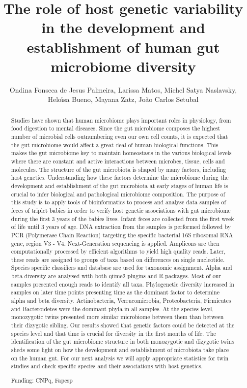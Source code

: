 \documentclass[twoside]{article}
\title{\vspace{-15mm}\fontsize{24pt}{10pt}\selectfont\textbf{ The role of host genetic variability in the development and establishment of human gut microbiome diversity }} %
\author{ Ondina Fonseca de Jesus Palmeira, Larissa Matos, Michel Satya Naslavsky, Helo\'{\i}sa Bueno, Mayana Zatz, Jo\~ao Carlos Setubal }
\affil{ Institute of Mathematics and Statistics - University of S\~ao Paulo }
\date{}
\begin{document}
  
  
  \maketitle %
  
  
  \thispagestyle{fancy} %
  
  
  \begin{abstract}
  Studies have shown that human microbiome plays important roles in physiology,  from food digestion to mental diseases. Since the gut microbiome composes the highest number of microbial cells outnumbering even our own cell counts,  it is expected that the gut microbiome would affect a great deal of human biological functions. This makes the gut microbiome key to maintain homeostasis in the various biological levels where there are constant and active interactions between microbes,  tissue,  cells and molecules. The structure of the gut microbiota is shaped by many factors,  including host genetics. Understanding how these factors determine the microbiome during the development and establishment of the gut microbiota at early stages of human life is crucial to infer biological and pathological microbiome composition. The purpose of this study is to apply tools of bioinformatics to process and analyse data samples of feces of triplet babies in order to verify host genetic associations with gut microbiome during the first 3 years of the babies lives.
Infant feces are collected from the first week of life until 3 years of age. DNA extraction from the samples is performed followed by PCR (Polymerase Chain Reaction) targeting the specific bacterial 16S ribosomal RNA gene,  region V3 - V4. Next-Generation sequencing is applied. Amplicons are then computationally processed by efficient algorithms to yield high quality reads. Later,  these reads are assigned to groups of taxa based on differences on  single nucleotide. Species specific classifiers and database are used for taxonomic assignment. Alpha and beta diversity are analysed with both qiime2 plugins and R packages.
Most of our samples presented enough reads to identify all taxa. Phylogenetic diversity increased in samples on later time points presenting time as the dominant factor to determine alpha and beta diversity. Actinobacteria,  Verrucomicrobia,  Proteobacteria,  Firmicutes and Bacteroidetes were the dominant phyla in all samples. At the species level,  monozygotic twins presented more similar microbiome between them than between their dizygotic sibling.
Our results showed that genetic factors could be detected at the species level and that time is crucial for diversity in the first months of life. The identification of the gut microbiome structure in both monozygotic and dizygotic twins sheds some light on how the development and establishment of microbiota take place on the human gut. For our next analysis we will apply appropriate statistics for twin studies and check specific species and their associations with host genetics.
  
  Funding: CNPq,  Fapesp \\ 
  \end{abstract}
  
\end{document}
